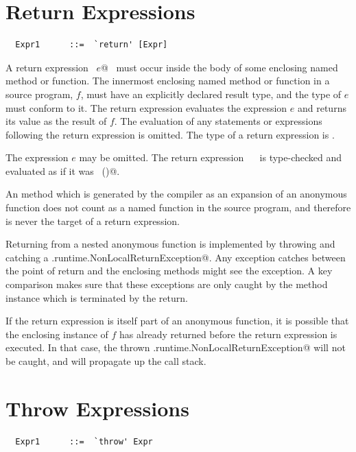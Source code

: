\section{Return Expressions}

\syntax\begin{lstlisting}
  Expr1      ::=  `return' [Expr]
\end{lstlisting}

A return expression ~\lstinline@return $e$@~ must occur inside the body of some
enclosing named method or function. The innermost enclosing named
method or function in a source program, $f$, must have an explicitly declared result type,
and the type of $e$ must conform to it.  
The return expression
evaluates the expression $e$ and returns its value as the result of
$f$. The evaluation of any statements or
expressions following the return expression is omitted. The type of 
a return expression is .

The expression $e$ may be omitted.  The return expression
~\lstinline@return@~ is type-checked and evaluated as if it was ~\lstinline@return ()@.

An \lstinline@apply@ method which is generated by the compiler as an
expansion of an anonymous function does not count as a named function
in the source program, and therefore is never the target of a return
expression.

Returning from a nested anonymous function is implemented by throwing
and catching a \lstinline@scala.runtime.NonLocalReturnException@.  Any
exception catches between the point of return and the enclosing
methods might see the exception.  A key comparison makes sure that
these exceptions are only caught by the method instance which is
terminated by the return.

If the return expression is itself part of an anonymous function, it
is possible that the enclosing instance of $f$ has already returned
before the return expression is executed. In that case, the thrown
\lstinline@scala.runtime.NonLocalReturnException@ will not be caught,
and will propagate up the call stack.



\section{Throw Expressions}

\syntax\begin{lstlisting}
  Expr1      ::=  `throw' Expr
\end{lstlisting}

